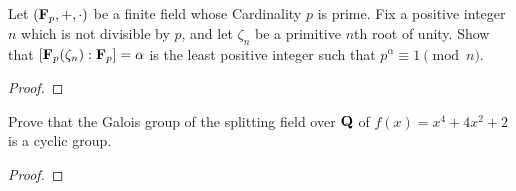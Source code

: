 \begin{problem}
Let $(\mathbf{F}_p,+,\cdot)$ be a finite field whose Cardinality $p$ is
prime. Fix a positive integer $n$ which is not divisible by $p$, and let
$\zeta_n$ be a primitive $n$th root of unity. Show that
$\left[\mathbf{F}_p(\zeta_n):\mathbf{F}_p\right]=\alpha$  is the least positive integer
such that $p^\alpha\equiv 1\pmod{n}$.
\end{problem}
\begin{proof}
\end{proof}

\begin{problem}
Prove that the Galois group of the splitting field over $\mathbf{Q}$ of
$f(x)=x^4+4x^2+2$ is a cyclic group.
\end{problem}
\begin{proof}
\end{proof}

